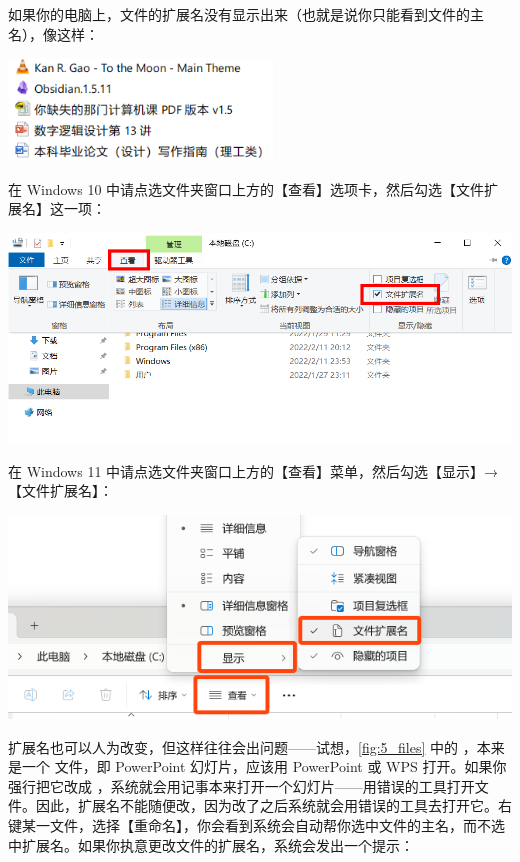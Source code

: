 \begin{note}
  如果你的电脑上，文件的扩展名没有显示出来（也就是说你只能看到文件的主名），像这样：

  \begin{center}
    \includegraphics[width=7cm]{assets/basic/5_files_not_showing_extensions.png}
    \label{fig:5_files_not_showing_extensions}
  \end{center}

  在 Windows 10 中请点选文件夹窗口上方的【查看】选项卡，然后勾选【文件扩展名】这一项：

  \begin{center}
    \includegraphics[width=.6\textwidth]{assets/basic/Windows_10_set_full_filename.png}
    \label{fig:Windows_10_set_full_filename}
  \end{center}

  在 Windows 11 中请点选文件夹窗口上方的【查看】菜单，然后勾选【显示】→【文件扩展名】：

  \begin{center}
    \includegraphics[width=.6\textwidth]{assets/basic/Windows_11_set_full_filename.png}
    \label{fig:Windows_11_set_full_filename}
  \end{center}
\end{note}

扩展名也可以人为改变，但这样往往会出问题——试想，\autoref{fig:5_files} 中的 ，本来是一个  文件，即 PowerPoint 幻灯片，应该用 PowerPoint 或 WPS 打开。如果你强行把它改成 ，系统就会用记事本来打开一个幻灯片——用错误的工具打开文件。因此，扩展名不能随便改，因为改了之后系统就会用错误的工具去打开它。右键某一文件，选择【重命名】，你会看到系统会自动帮你选中文件的主名，而不选中扩展名。如果你执意更改文件的扩展名，系统会发出一个提示：

